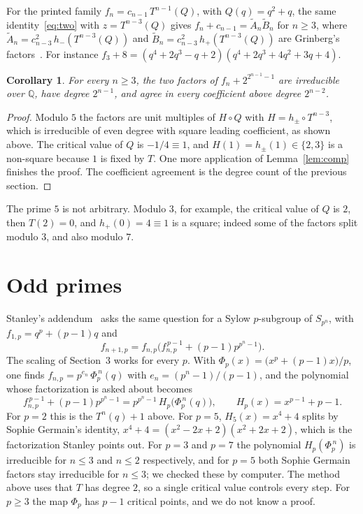 \documentclass[11pt]{article}
\newtheorem{corollary}{Corollary}
\theoremstyle{remark}
\begin{document}
For the printed family $f_n=c_{n-1}\,T^{n-1}(Q)$, with $Q(q)=q^2+q$, the same identity~\eqref{eq:two} with $z=T^{n-3}(Q)$ gives $f_n+c_{n-1}=\tilde A_n\tilde B_n$ for $n\ge3$, where $\tilde A_n=c_{n-3}^2\,h_-(T^{n-3}(Q))$ and $\tilde B_n=c_{n-3}^2\,h_+(T^{n-3}(Q))$ are Grinberg's factors~\cite{Grinberg}. For instance $f_3+8=(q^4+2q^3-q+2)(q^4+2q^3+4q^2+3q+4)$.

\begin{corollary}
For every $n\ge3$, the two factors of $f_n+2^{2^{n-1}-1}$ are irreducible over $\mathbb Q$, have degree $2^{n-1}$, and agree in every coefficient above degree $2^{n-2}$.
\end{corollary}

\begin{proof}
Modulo $5$ the factors are unit multiples of $H\circ Q$ with $H=h_\pm\circ T^{n-3}$, which is irreducible of even degree with square leading coefficient, as shown above. The critical value of $Q$ is $-1/4\equiv1$, and $H(1)=h_\pm(1)\in\{2,3\}$ is a non-square because $1$ is fixed by $T$. One more application of Lemma~\ref{lem:comp} finishes the proof. The coefficient agreement is the degree count of the previous section.
\end{proof}

The prime $5$ is not arbitrary. Modulo $3$, for example, the critical value of $Q$ is $2$, then $T(2)=0$, and $h_+(0)=4\equiv1$ is a square; indeed some of the factors split modulo $3$, and also modulo $7$.

\section{Odd primes}

Stanley's addendum~\cite{MO} asks the same question for a Sylow $p$-subgroup of $S_{p^n}$, with $f_{1,p}=q^p+(p-1)q$ and
\[
f_{n+1,p}=f_{n,p}\bigl(f_{n,p}^{\,p-1}+(p-1)p^{p^n-1}\bigr).
\]
The scaling of Section~3 works for every $p$. With $\Phi_p(x)=\bigl(x^p+(p-1)x\bigr)/p$, one finds $f_{n,p}=p^{e_n}\,\Phi_p^{\,n}(q)$ with $e_n=(p^n-1)/(p-1)$, and the polynomial whose factorization is asked about becomes
\[
f_{n,p}^{\,p-1}+(p-1)p^{p^n-1}=p^{p^n-1}\,H_p\bigl(\Phi_p^{\,n}(q)\bigr),\qquad H_p(x)=x^{p-1}+p-1 .
\]
For $p=2$ this is the $T^n(q)+1$ above. For $p=5$, $H_5(x)=x^4+4$ splits by Sophie Germain's identity, $x^4+4=(x^2-2x+2)(x^2+2x+2)$, which is the factorization Stanley points out. For $p=3$ and $p=7$ the polynomial $H_p(\Phi_p^{\,n})$ is irreducible for $n\le3$ and $n\le2$ respectively, and for $p=5$ both Sophie Germain factors stay irreducible for $n\le3$; we checked these by computer. The method above uses that $T$ has degree $2$, so a single critical value controls every step. For $p\ge3$ the map $\Phi_p$ has $p-1$ critical points, and we do not know a proof.
\end{document}
